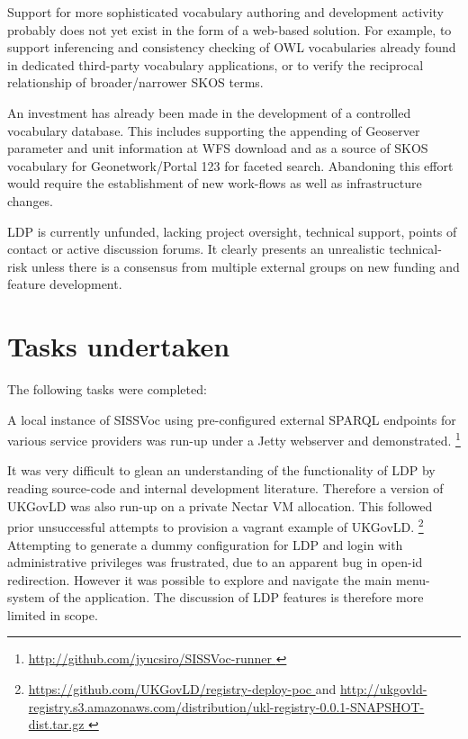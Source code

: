 \documentclass[10pt,a4paper]{article}
\begin{document}
\begin{flushleft}
\item[] Support for more sophisticated vocabulary authoring and development 
activity probably does not yet exist in the form of a web-based solution. For 
example, to support inferencing and consistency checking of OWL vocabularies already 
found in dedicated third-party vocabulary applications, or to verify the 
reciprocal relationship of broader/narrower SKOS terms.
\item[] An investment has already been made in the development of a controlled vocabulary 
database. This includes supporting the appending of Geoserver parameter and 
unit information at WFS download and 
as a source of SKOS vocabulary for Geonetwork/Portal 123 for faceted search. 
Abandoning this effort would require the establishment of new work-flows as well as infrastructure
changes.
\item[] LDP is currently unfunded, lacking project oversight, technical 
support, points of contact or active discussion forums. It clearly presents an unrealistic technical-risk 
unless there is a consensus from multiple external groups on new funding and 
feature development.


\clearpage



\section{
  Tasks undertaken
}

%  
  The following tasks were completed:  

    \item[] A local instance of SISSVoc using pre-configured external SPARQL
  endpoints for various service providers was run-up under a Jetty webserver and
  demonstrated.  \footnote{ \url {
  http://github.com/jyucsiro/SISSVoc-runner }  } 

    \item[] It was very difficult to glean an understanding of the
  functionality of LDP by reading source-code and internal development
  literature. Therefore a version of UKGovLD was also run-up on a private Nectar
  VM allocation. This followed prior unsuccessful attempts to provision a vagrant
  example of UKGovLD.  \footnote{ \url {
  https://github.com/UKGovLD/registry-deploy-poc } and \url {
  http://ukgovld-registry.s3.amazonaws.com/distribution/ukl-registry-0.0.1-SNAPSHOT-dist.tar.gz
  } }
    Attempting to generate a dummy configuration for LDP and login with
  administrative privileges was frustrated, due to an apparent bug in open-id redirection.
  However it was possible to explore and navigate the main menu-system of the
  application.
    The discussion of LDP features is therefore more limited in scope.


\end{flushleft}
\end{document}
